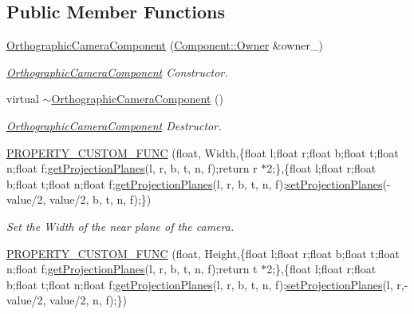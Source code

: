 \subsection*{Public Member Functions}
\begin{DoxyCompactItemize}
\item 
\hyperlink{class_orthographic_camera_component_a0f44d5eef1e6d2da9ffd83815e357f8e}{Orthographic\+Camera\+Component} (\hyperlink{class_magnum_1_1_component_1_1_owner}{Component\+::\+Owner} \&owner\+\_\+)
\begin{DoxyCompactList}\small\item\em \hyperlink{class_orthographic_camera_component}{Orthographic\+Camera\+Component} Constructor. \end{DoxyCompactList}\item 
virtual \hyperlink{class_orthographic_camera_component_a10165141f6f076d9a488f3ac9f7f644e}{$\sim$\+Orthographic\+Camera\+Component} ()
\begin{DoxyCompactList}\small\item\em \hyperlink{class_orthographic_camera_component}{Orthographic\+Camera\+Component} Destructor. \end{DoxyCompactList}\item 
\hyperlink{class_orthographic_camera_component_a596bb5412a111382599e19ba6ef5b716}{P\+R\+O\+P\+E\+R\+T\+Y\+\_\+\+C\+U\+S\+T\+O\+M\+\_\+\+F\+U\+NC} (float, Width,\{float l;float r;float b;float t;float n;float f;\hyperlink{class_magnum_1_1_camera_component_af5d94dcadd4011e3a0dad972c8eadd9b}{get\+Projection\+Planes}(l, r, b, t, n, f);return r $\ast$2;\},\{float l;float r;float b;float t;float n;float f;\hyperlink{class_magnum_1_1_camera_component_af5d94dcadd4011e3a0dad972c8eadd9b}{get\+Projection\+Planes}(l, r, b, t, n, f);\hyperlink{class_magnum_1_1_camera_component_ab50fcc345c5beb14317b4bb74f6c2b2e}{set\+Projection\+Planes}(-\/value/2, value/2, b, t, n, f);\})
\begin{DoxyCompactList}\small\item\em Set the Width of the near plane of the camera. \end{DoxyCompactList}\item 
\hyperlink{class_orthographic_camera_component_a98acf1c9d520fd14b500c4aa57765696}{P\+R\+O\+P\+E\+R\+T\+Y\+\_\+\+C\+U\+S\+T\+O\+M\+\_\+\+F\+U\+NC} (float, Height,\{float l;float r;float b;float t;float n;float f;\hyperlink{class_magnum_1_1_camera_component_af5d94dcadd4011e3a0dad972c8eadd9b}{get\+Projection\+Planes}(l, r, b, t, n, f);return t $\ast$2;\},\{float l;float r;float b;float t;float n;float f;\hyperlink{class_magnum_1_1_camera_component_af5d94dcadd4011e3a0dad972c8eadd9b}{get\+Projection\+Planes}(l, r, b, t, n, f);\hyperlink{class_magnum_1_1_camera_component_ab50fcc345c5beb14317b4bb74f6c2b2e}{set\+Projection\+Planes}(l, r,-\/value/2, value/2, n, f);\})

\end{DoxyCompactItemize}
